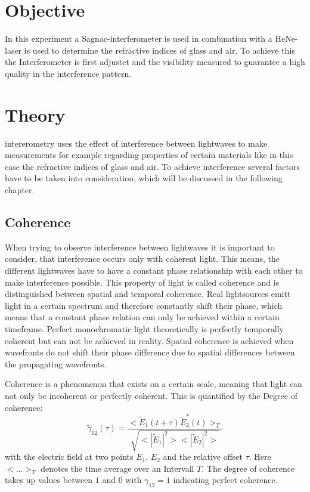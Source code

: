 \section{Objective}
In this experiment a Sagnac-interferometer is used in combination with a HeNe-laser is used to determine the refractive indices of glass and air. To achieve this the Interferometer is first adjustet and the visibility measured to guarantee a high quality in the interference pattern.
\section{Theory}
\label{sec:Theorie}
intererometry uses the effect of interference between lightwaves to make measurements for example regarding properties of certain materials like in this case the refractive indices of glass and air. To achieve interference several factors have to be taken into consideration, which will be discussed in the following chapter.
\subsection{Coherence}
When trying to observe interference between lightwaves it is important to consider, that interference occurs only with coherent light. This means, the different lightwaves have to have a constant phase relationship with each other to make interference possible. This property of light is called coherence and is distinguished between spatial and temporal coherence. Real lightsources emitt light in a certain spectrum and therefore constantly shift their phase, which means that a constant phase relation can only be achieved within a certain timeframe. Perfect monochromatic light theoretically is perfectly temporally coherent but can not be achieved in reality. Spatial coherence is achieved when wavefronts do not shift their phase difference due to spatial differences between the propagating wavefronts.%

Coherence is a phenomenon that exists on a certain scale, meaning that light can not only be incoherent or perfectly coherent. This is quantified by the Degree of coherence:
\begin{equation}
 \tilde{\gamma}_{12}(\tau)=\frac{\bigl<\tilde{E}_1(t+\tau)\tilde{E}^*_2(t)\bigr>_T}{\sqrt{\bigl<|\tilde{E}_1|^2\bigr>\bigl<|\tilde{E}_2|^2\bigr>}}
\end{equation}
with the electric field at two points $E_1$, $E_2$ and the relative offset $\tau$. Here $\bigl<...\bigr>_T$ denotes the time average over an Intervall $T$. The degree of coherence takes up values between $1$ and $0$ with $\gamma_{12}=1$ indicating perfect coherence.
